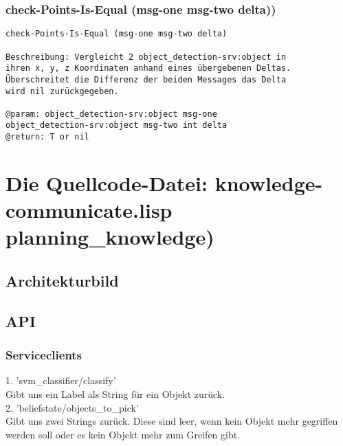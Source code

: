 \documentclass{suturo}
\begin{document}
\subsubsection{check-Points-Is-Equal (msg-one msg-two delta))}
\begin{verbatim}
check-Points-Is-Equal (msg-one msg-two delta)

Beschreibung: Vergleicht 2 object_detection-srv:object in
ihren x, y, z Koordinaten anhand eines übergebenen Deltas.
Überschreitet die Differenz der beiden Messages das Delta
wird nil zurückgegeben.

@param: object_detection-srv:object msg-one 
object_detection-srv:object msg-two int delta
@return: T or nil
\end{verbatim}

\section{Die Quellcode-Datei: knowledge-communicate.lisp\\
planning\_knowledge)}

\subsection{Architekturbild}

\begin{figure}[!htb]
\end{figure}

\subsection{API}
\subsubsection{Serviceclients}
1. 'svm\_classifier/classify' \\
Gibt uns ein Label als String für ein Objekt zurück.\\

2. 'beliefstate/objects\_to\_pick'\\
Gibt uns zwei Strings zurück. Diese sind leer, wenn kein Objekt mehr gegriffen werden soll oder es kein Objekt mehr zum Greifen gibt.
\end{document}
